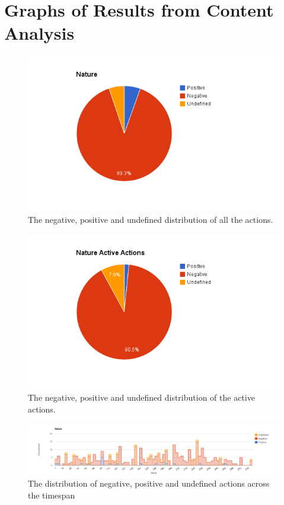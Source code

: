 \chapter{Graphs of Results from Content Analysis}

\begin{figure}[!h]
	\centering
	\includegraphics[width=\textwidth, keepaspectratio]{figures/nature-p.png}
	\caption{The negative, positive and undefined distribution of all the actions.}
	\label{figure:nature-p}
\end{figure}

\begin{figure}[!h]
	\centering
	\includegraphics[width=\textwidth, keepaspectratio]{figures/nature-pa.png}
	\caption{The negative, positive and undefined distribution of the active actions.}
	\label{figure:nature-pa}
\end{figure}

\begin{figure}
	\centering
	\includegraphics[width=\textwidth, keepaspectratio]{figures/nature-l.png}
	\caption{The distribution of negative, positive and undefined actions across the timespan}
	\label{figure:nature-la}
\end{figure}

